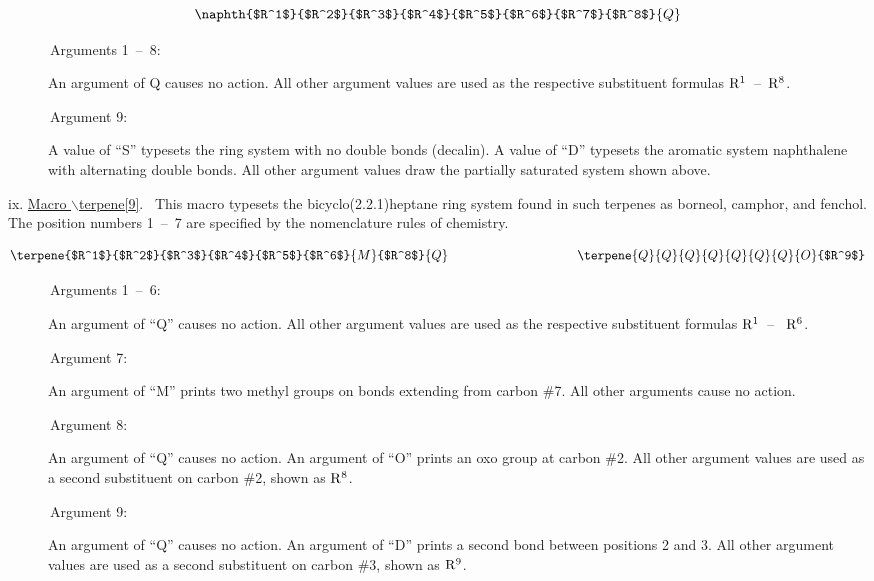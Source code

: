  \[ \naphth{$R^1$}{$R^2$}{$R^3$}{$R^4$}{$R^5$}{$R^6$}{$R^7$}
           {$R^8$}{Q} \]

 \begin{description}
 \item[{\rm \ \ \ \ \ \ Arguments 1~--~8:}] An argument of Q causes
      no action. All other argument values are used as the 
      respective substituent formulas ${\rm R^1}$~--~${\rm R^8}$.
 \item[{\rm \ \ \ \ \ \ Argument 9:}] A value of ``S'' typesets the
      ring system with no double bonds (decalin). A value of ``D''
      typesets the aromatic system naphthalene with alternating
      double bonds. All other argument values draw the partially
      saturated system shown above.
 \end{description}
 
 \vspace{\len mm}
 \indent ix. \underline{Macro $\backslash $terpene[9]}. 
 \ This macro typesets the bicyclo(2.2.1)heptane ring system
 found in such terpenes as borneol, camphor, and fenchol.
 The position numbers 1~--~7 are specified by the 
 nomenclature rules of chemistry.

 \[ \terpene{$R^1$}{$R^2$}{$R^3$}{$R^4$}{$R^5$}{$R^6$}
            {M}{$R^8$}{Q}   \hspace{3.5cm}
    \terpene{Q}{Q}{Q}{Q}{Q}{Q}{Q}{O}{$R^9$} \]
 
 \begin{description}
 \item[{\rm \ \ \ \ \ \ Arguments 1~--~6:}]  An argument of ``Q''
       causes no action. All other argument values are used
       as the respective substituent formulas ${\rm R^1}$~--~
       ${\rm R^6}$.
 \item[{\rm \ \ \ \ \ \ Argument 7:}] An argument of ``M''
       prints two methyl groups on bonds extending from
       carbon \#7.  All other arguments cause no action.
 \item[{\rm \ \ \ \ \ \ Argument 8:}] An argument of ``Q''
      causes no action. An argument of ``O'' prints an
      oxo group at carbon \#2. All other argument values
      are used as a second substituent on carbon \#2,
      shown as ${\rm R^8}$.
 \item[{\rm \ \ \ \ \ \ Argument 9:}] An argument of ``Q''
      causes no action. An argument of ``D'' prints a second bond
      between positions 2 and 3. All other argument values
      are used as a second substituent on carbon \#3, 
      shown as ${\rm R^9}$.
 \end{description}  


